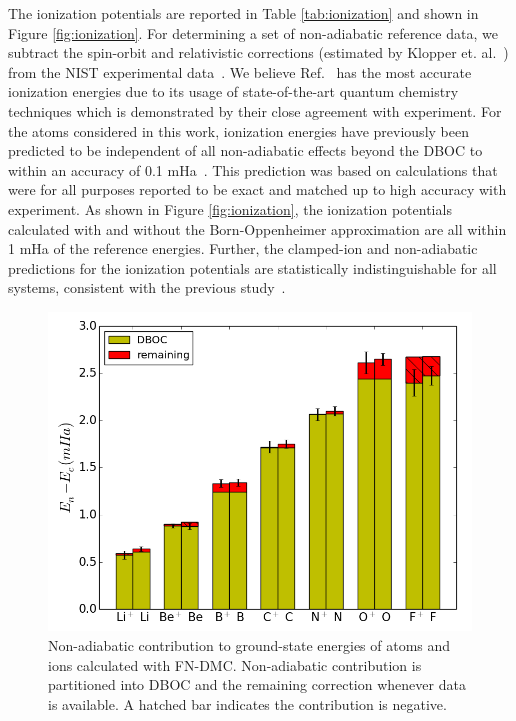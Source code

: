 \documentclass[pra,superscriptaddress,groupedaddress,twocolumn]{revtex4}
\begin{document}
The ionization potentials are reported in Table \ref{tab:ionization} and shown in Figure \ref{fig:ionization}. For determining a set of non-adiabatic reference data, we subtract the spin-orbit and relativistic corrections (estimated by Klopper et. al.~\cite{Klopper_IP}) from the NIST experimental data~\cite{NIST_Atoms}. We believe Ref.~\cite{Klopper_IP} has the most accurate ionization energies due to its usage of state-of-the-art quantum chemistry techniques which is demonstrated by their close agreement with experiment.
For the atoms considered in this work, ionization energies have previously been predicted to be independent of all non-adiabatic effects beyond the DBOC to within an accuracy of 0.1 mHa~\cite{Klopper_IP}. This prediction was based on calculations that were for all purposes reported to be exact and matched up to high accuracy with experiment. As shown in Figure \ref{fig:ionization}, the ionization potentials calculated with and without the Born-Oppenheimer approximation are all within 1 mHa of the reference energies. Further, the clamped-ion and non-adiabatic predictions for the ionization potentials are statistically indistinguishable for all systems, consistent with the previous study~\cite{Klopper_IP}.

\begin{figure}[h]
\includegraphics[scale=.37]{Figures/atom-nad-ad}
\caption{Non-adiabatic contribution to ground-state energies of atoms and ions calculated with FN-DMC. Non-adiabatic contribution is partitioned into DBOC and the remaining correction whenever data is available. A hatched bar indicates the contribution is negative. \label{fig:atom-nad-ad}} %
\end{figure}
\end{document}
